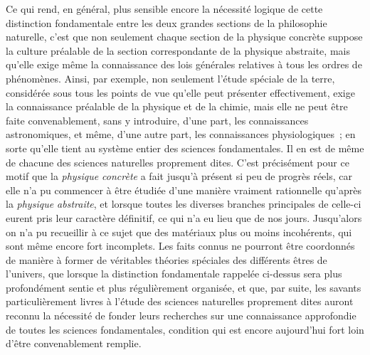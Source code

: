 \documentclass[french,twoside]{book} %
\begin{document}
Ce qui rend, en général, plus sensible encore la nécessité logique de cette distinction fondamentale entre les deux grandes sections de la philosophie naturelle, c’est que non seulement chaque section de la physique concrète suppose la culture préalable de la section correspondante de la physique abstraite, mais qu’elle exige même la connaissance des lois générales relatives à tous les ordres de phénomènes. Ainsi, par exemple, non seulement l’étude spéciale de la terre, considérée sous tous les points de vue qu’elle peut présenter effectivement, exige la connaissance préalable de la physique et de la chimie, mais elle ne peut être faite convenablement, sans y introduire, d’une part, les connaissances astronomiques, et même, d’une autre part, les connaissances physiologiques ; en sorte qu’elle tient au système entier des sciences fondamentales. Il en est de même de chacune des sciences naturelles proprement dites. C’est précisément pour ce motif que la {\itshape physique concrète} a fait jusqu’à présent si peu de progrès réels, car elle n’a pu commencer à être étudiée d’une manière vraiment rationnelle qu’après la {\itshape physique abstraite}, et lorsque toutes les diverses branches principales de celle-ci eurent pris leur caractère définitif, ce qui n’a eu lieu que de nos jours. Jusqu’alors on n’a pu recueillir à ce sujet que des matériaux plus ou moins incohérents, qui sont même encore fort incomplets. Les faits connus ne pourront être coordonnés de manière à former de véritables théories spéciales des différents êtres de l’univers, que lorsque la distinction fondamentale rappelée ci-dessus sera plus profondément sentie et plus régulièrement organisée, et que, par suite, les savants particulièrement livres à l’étude des sciences naturelles proprement dites auront reconnu la nécessité de fonder leurs recherches sur une connaissance approfondie de toutes les sciences fondamentales, condition qui est encore aujourd’hui fort loin d’être convenablement remplie.\par
\end{document}
